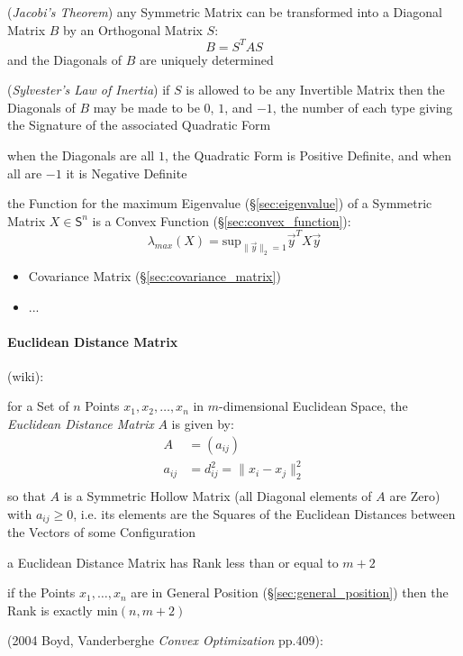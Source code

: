 (\emph{Jacobi's Theorem}) any Symmetric Matrix can be transformed into a
Diagonal Matrix $B$ by an Orthogonal Matrix $S$:
\[
  B = S^T A S
\]
and the Diagonals of $B$ are uniquely determined

(\emph{Sylvester's Law of Inertia}) if $S$ is allowed to be any Invertible
Matrix then the Diagonals of $B$ may be made to be $0$, $1$, and $-1$, the
number of each type giving the Signature of the associated Quadratic Form

when the Diagonals are all $1$, the Quadratic Form is Positive Definite, and
when all are $-1$ it is Negative Definite

the Function for the maximum Eigenvalue (\S\ref{sec:eigenvalue}) of a Symmetric
Matrix $X \in \mathsf{S}^n$ is a Convex Function (\S\ref{sec:convex_function}):
\[
  \lambda_{max}(X) = \mathrm{sup}_{\|\vec{y}\|_2=1} \vec{y}^T X \vec{y}
\]

\begin{itemize}
  \item Covariance Matrix (\S\ref{sec:covariance_matrix})
  \item ...
\end{itemize}



\paragraph{Euclidean Distance Matrix}\label{sec:euclidean_distance_matrix}\hfill

(wiki):

for a Set of $n$ Points $x_1, x_2, \ldots, x_n$ in $m$-dimensional Euclidean
Space, the \emph{Euclidean Distance Matrix} $A$ is given by:
\begin{align*}
  A      & = (a_{ij}) \\
  a_{ij} & = d_{ij}^2 = \|x_i - x_j\|_2^2 \\
\end{align*}
so that $A$ is a Symmetric Hollow Matrix (all Diagonal elements of $A$ are
Zero) with $a_{ij} \geq 0$, i.e. its elements are the Squares of the Euclidean
Distances between the Vectors of some Configuration

a Euclidean Distance Matrix has Rank less than or equal to $m+2$

if the Points $x_1, \ldots, x_n$ are in General Position
(\S\ref{sec:general_position}) then the Rank is exactly $\mathrm{min}(n,m+2)$

(2004 Boyd, Vanderberghe \emph{Convex Optimization} pp.409):

